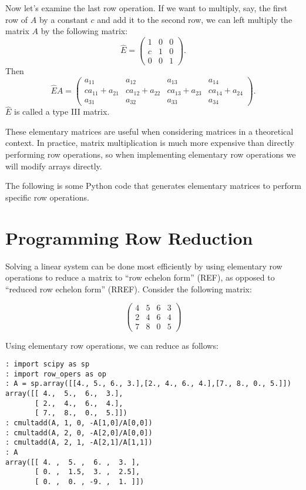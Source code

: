 Now let's examine the last row operation.
If we want to multiply, say, the first row of $A$ by a constant $c$ and add it to the second row, we can left multiply the matrix $A$ by the following matrix:
\[
\widehat{E} = \begin{pmatrix}
1&0&0\\
c&1&0\\
0&0&1
\end{pmatrix}.
\]
Then
\[
\widehat{E} A =
\begin{pmatrix}
a_{11}&a_{12}&a_{13}&a_{14}\\
c a_{11} + a_{21}&c a_{12} + a_{22}&c a_{13} + a_{23}&c a_{14} + a_{24}\\
a_{31}&a_{32}&a_{33}&a_{34}
\end{pmatrix}.
\]
$\widehat{E}$ is called a type III matrix.

These elementary matrices are useful when considering matrices in a theoretical context.
In practice, matrix multiplication is much more expensive than directly performing row operations, so when implementing elementary row operations we will modify arrays directly.

The following is some Python code that generates elementary matrices to perform specific row operations.


\section*{Programming Row Reduction}

Solving a linear system can be done most efficiently by using elementary row operations to reduce a matrix to ``row echelon form'' (REF), as opposed to ``reduced row echelon form'' (RREF).
Consider the following matrix: 

\[
\begin{pmatrix}
4&5&6&3 \\
2&4&6&4 \\
7&8&0&5
\end{pmatrix}
\]

Using elementary row operations, we can reduce as follows:
\begin{lstlisting}
: import scipy as sp
: import row_opers as op
: A = sp.array([[4., 5., 6., 3.],[2., 4., 6., 4.],[7., 8., 0., 5.]])
array([[ 4.,  5.,  6.,  3.],
       [ 2.,  4.,  6.,  4.],
       [ 7.,  8.,  0.,  5.]])
: cmultadd(A, 1, 0, -A[1,0]/A[0,0])
: cmultadd(A, 2, 0, -A[2,0]/A[0,0])
: cmultadd(A, 2, 1, -A[2,1]/A[1,1])
: A
array([[ 4. ,  5. ,  6. ,  3. ],
       [ 0. ,  1.5,  3. ,  2.5],
       [ 0. ,  0. , -9. ,  1. ]])
\end{lstlisting}

